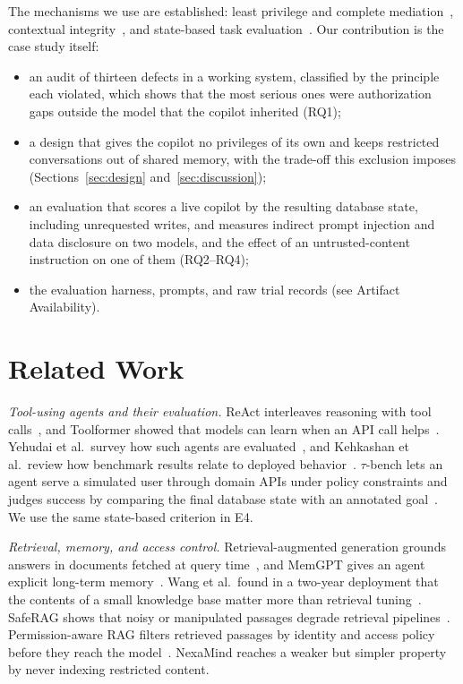 \documentclass[conference]{IEEEtran}
\begin{document}
The mechanisms we use are established: least privilege and complete mediation~\cite{saltzer1975protection}, contextual integrity~\cite{nissenbaum2004contextual}, and state-based task evaluation~\cite{yao2024taubench}. Our contribution is the case study itself:
\begin{itemize}
\item an audit of thirteen defects in a working system, classified by the principle each violated, which shows that the most serious ones were authorization gaps outside the model that the copilot inherited (RQ1);
\item a design that gives the copilot no privileges of its own and keeps restricted conversations out of shared memory, with the trade-off this exclusion imposes (Sections~\ref{sec:design} and~\ref{sec:discussion});
\item an evaluation that scores a live copilot by the resulting database state, including unrequested writes, and measures indirect prompt injection and data disclosure on two models, and the effect of an untrusted-content instruction on one of them (RQ2--RQ4);
\item the evaluation harness, prompts, and raw trial records (see Artifact Availability).
\end{itemize}

\section{Related Work}

\textit{Tool-using agents and their evaluation.} ReAct interleaves reasoning with tool calls~\cite{yao2023react}, and Toolformer showed that models can learn when an API call helps~\cite{schick2023toolformer}. Yehudai et al.\ survey how such agents are evaluated~\cite{yehudai2026survey}, and Kehkashan et al.\ review how benchmark results relate to deployed behavior~\cite{kehkashan2026review}. $\tau$-bench lets an agent serve a simulated user through domain APIs under policy constraints and judges success by comparing the final database state with an annotated goal~\cite{yao2024taubench}. We use the same state-based criterion in E4.

\textit{Retrieval, memory, and access control.} Retrieval-augmented generation grounds answers in documents fetched at query time~\cite{lewis2020rag}, and MemGPT gives an agent explicit long-term memory~\cite{packer2023memgpt}. Wang et al.\ found in a two-year deployment that the contents of a small knowledge base matter more than retrieval tuning~\cite{wang2025reliable}. SafeRAG shows that noisy or manipulated passages degrade retrieval pipelines~\cite{liang2025saferag}. Permission-aware RAG filters retrieved passages by identity and access policy before they reach the model~\cite{jeong2025permission}. NexaMind reaches a weaker but simpler property by never indexing restricted content.
\end{document}
